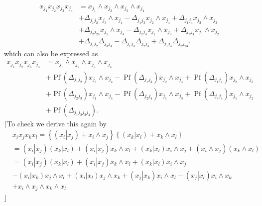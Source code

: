 \documentclass[aps, preprint]{revtex4}
\begin{document}
\begin{align}x_{j_{1}} x_{j_{2}} x_{j_{3}} x_{j_{4}} &  =x_{j_{1}} \wedge x_{j_{2}} \wedge x_{j_{3}} \wedge x_{j_{4}} \nonumber  \\
 &  + \Delta _{j_{1} j_{2}}x_{j_{3}} \wedge x_{j_{4}} - \Delta _{j_{1} j_{3}}x_{j_{2}} \wedge x_{j_{4}} + \Delta _{j_{1} j_{4}}x_{j_{2}} \wedge x_{j_{3}} \nonumber  \\
 &  + \Delta _{j_{2} j_{2 3}}x_{j_{1}} \wedge x_{j_{4}} - \Delta _{j_{2} j_{4}}x_{j_{1}} \wedge x_{j_{3}} + \Delta _{j_{3} j_{4}}x_{j_{1}} \wedge x_{j_{2}} \nonumber  \\
 &  + \Delta _{j_{1} j_{2}} \Delta _{j_{3} j_{4}} -  \Delta _{j_{1} j_{3}} \Delta _{j_{2} j_{4}} +  \Delta _{j_{1} j_{4}} \Delta _{j_{2} j_{2 3}}\text{.}\end{align}which can also be expressed as
\begin{align}x_{j_{1}} x_{j_{2}} x_{j_{3}} x_{j_{4}} &  =x_{j_{1}} \wedge x_{j_{2}} \wedge x_{j_{3}} \wedge x_{j_{4}} \nonumber  \\
 &  +\ensuremath{\operatorname*{Pf}} \left ( \Delta _{j_{1} j_{2}}\right ) x_{j_{3}} \wedge x_{j_{4}} -\ensuremath{\operatorname*{Pf}} \left ( \Delta _{j_{1} j_{3}}\right ) x_{j_{2}} \wedge x_{j_{4}} +\ensuremath{\operatorname*{Pf}} \left ( \Delta _{j_{1} j_{4}}\right ) x_{j_{2}} \wedge x_{j_{3}} \nonumber  \\
 &  +\ensuremath{\operatorname*{Pf}} \left ( \Delta _{j_{2} j_{3}}\right ) x_{j_{1}} \wedge x_{j_{4}} -\ensuremath{\operatorname*{Pf}} \left ( \Delta _{j_{2} j_{4}}\right ) x_{j_{1}} \wedge x_{j_{3}} +\ensuremath{\operatorname*{Pf}} \left ( \Delta _{j_{3} j_{4}}\right ) x_{j_{1}} \wedge x_{j_{2}} \nonumber  \\
 &  +\ensuremath{\operatorname*{Pf}} \left ( \Delta _{j_{1} j_{2} j_{3} j_{4}}\right )\text{.}\end{align}$\lceil $To check we derive this again by
\begin{align} & x_{i} x_{j} x_{k} x_{l} =\left \{\left (x_{i}\left \vert x_{j}\right .\right ) +x_{i} \wedge x_{j}\right \}\left \{\left (x_{k}\left \vert x_{l}\right .\right ) +x_{k} \wedge x_{l}\right \} \nonumber  \\
 &  =\left (x_{i}\left \vert x_{j}\right .\right ) \left (x_{k}\left \vert x_{l}\right .\right ) +\left (x_{i}\left \vert x_{j}\right .\right ) x_{k} \wedge x_{l} +\left (x_{k}\left \vert x_{l}\right .\right ) x_{i} \wedge x_{j} +\left (x_{i} \wedge x_{j}\right ) \left (x_{k} \wedge x_{l}\right ) \nonumber  \\
 &  =\left (x_{i}\left \vert x_{j}\right .\right ) \left (x_{k}\left \vert x_{l}\right .\right ) +\left (x_{i}\left \vert x_{j}\right .\right ) x_{k} \wedge x_{l} +\left (x_{k}\left \vert x_{l}\right .\right ) x_{i} \wedge x_{j} \nonumber  \\
 &  -\left (\left .x_{i}\right \vert x_{k}\right ) x_{j} \wedge x_{l} +\left (\left .x_{i}\right \vert x_{l}\right ) x_{j} \wedge x_{k} +\left (\left .x_{j}\right \vert x_{k}\right ) x_{i} \wedge x_{l} -\left (\left .x_{j}\right \vert x_{l}\right ) x_{i} \wedge x_{k} \nonumber  \\
 &  +x_{i} \wedge x_{j} \wedge x_{k} \wedge x_{l}\end{align}$\rfloor $ 
\end{document}
